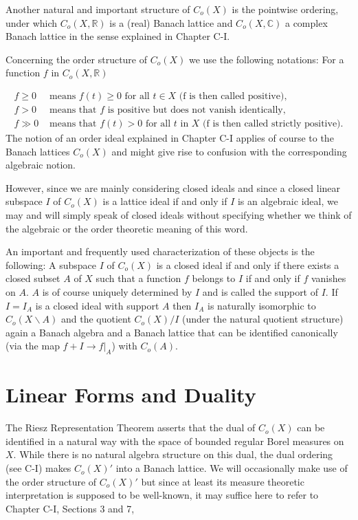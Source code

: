 \newpage 



Another natural and important structure of $C_{o}(X)$ is the pointwise ordering, under which $C_{o}(X,\mathbb{R})$ is a (real) Banach lattice and $C_{o}(X,\mathbb{C})$ a complex Banach lattice in the sense explained in Chapter C-I.

Concerning the order structure of $C_{o}(X)$ we use the following notations: For a function $f$ in $C_{o}(X,\mathbb{R})$

\[
\begin{aligned}
	f \geq 0 &\text{ means } f(t) \geq 0 \text{ for all } t \in X \text{ (f is 			             then called positive)}, \\
	f > 0 &\text{ means that } f \text{ is positive but does not vanish identically}, \\
	f \gg 0 &\text{ means that } f(t) > 0 \text{ for all } t \text{ in } X \text{ (f is then called strictly positive)}.
\end{aligned}
\]
The notion of an order ideal explained in Chapter C-I applies of course to the Banach lattices $C_{o}(X)$ and might give rise to confusion with the corresponding algebraic notion.

However, since we are mainly considering closed ideals and since a closed linear subspace $I$ of $C_{o}(X)$ is a lattice ideal if and only if $I$ is an algebraic ideal, we may and will simply speak of closed ideals without specifying whether we think of the algebraic or the order theoretic meaning of this word.

An important and frequently used characterization of these objects is the following: A subspace $I$ of $C_{o}(X)$ is a closed ideal if and only if there exists a closed subset $A$ of $X$ such that a function $f$ belongs to $I$ if and only if $f$ vanishes on $A$.
$A$ is of course uniquely determined by $I$ and is called the support of $I$.
If $I = I_{A}$ is a closed ideal with support $A$ then $I_{A}$ is naturally isomorphic to $C_{o}(X\backslash A)$ and the quotient $C_{o}(X)/I$ (under the natural quotient structure) again a Banach algebra and a Banach lattice that can be identified canonically (via the map $f + I \to f|_{A}$) with $C_{o}(A)$.

\section{Linear Forms and Duality}\label{sec:b1-2}

The Riesz Representation Theorem asserts that the dual of $C_{o}(X)$ can be identified in a natural way with the space of bounded regular Borel measures on $X$.
While there is no natural algebra structure on this dual, the dual ordering (see C-I) makes $C_{o}(X)'$ into a Banach lattice.
We will occasionally make use of the order structure of $C_{o}(X)'$ but since at least its measure theoretic interpretation is supposed to be well-known, it may suffice here to refer to Chapter C-I, Sections 3 and 7, 

